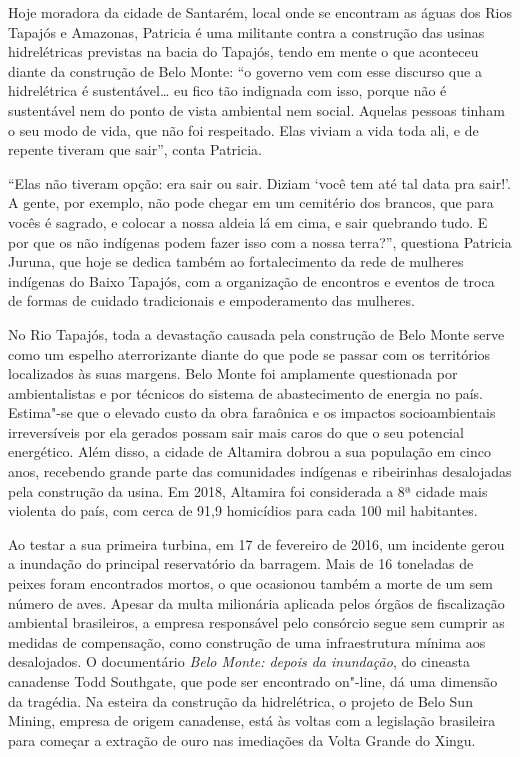 Hoje moradora da cidade de Santarém, local onde se encontram as águas
dos Rios Tapajós e Amazonas, Patricia é uma militante contra a
construção das usinas hidrelétricas previstas na bacia do Tapajós, tendo
em mente o que aconteceu diante da construção de Belo %
Monte: ``o governo vem com esse discurso que a hidrelétrica é
sustentável\ldots{} eu fico tão indignada com isso, porque não é
sustentável nem do ponto de vista ambiental nem social. Aquelas pessoas
tinham o seu modo de vida, que não foi respeitado. Elas viviam a vida
toda ali, e de repente tiveram que sair'', conta Patricia.

``Elas não tiveram opção: era sair ou sair. Diziam `você tem até tal
data pra sair!'. A gente, por exemplo, não pode chegar em um cemitério
dos brancos, que para vocês é sagrado, e colocar a nossa aldeia lá em
cima, e sair quebrando tudo. E por que os não indígenas podem fazer isso
com a nossa terra?'', questiona Patricia Juruna, que hoje se dedica também ao
fortalecimento da rede de mulheres indígenas do Baixo Tapajós, com a
organização de encontros e eventos de troca de formas de cuidado
tradicionais e empoderamento das mulheres.

No Rio Tapajós, toda a devastação causada pela construção de Belo Monte
serve como um espelho aterrorizante diante do que pode se passar com os
territórios localizados às suas margens. Belo Monte foi amplamente
questionada por ambientalistas e por técnicos do sistema de
abastecimento de energia no país. Estima"-se que o elevado custo da obra
faraônica e os impactos socioambientais irreversíveis por ela gerados
possam sair mais caros do que o seu potencial energético. Além disso, a
cidade de Altamira dobrou a sua população em cinco anos, recebendo
grande parte das comunidades indígenas e ribeirinhas desalojadas pela
construção da usina. Em 2018, Altamira foi considerada a 8ª cidade mais
violenta do país, com cerca de 91,9 homicídios para cada 100 mil
habitantes.

Ao testar a sua primeira turbina, em 17 de fevereiro de 2016, um
incidente gerou a inundação do principal reservatório da barragem. Mais
de 16 toneladas de peixes foram encontrados mortos, o que ocasionou
também a morte de um sem número de aves. Apesar da multa milionária
aplicada pelos órgãos de fiscalização ambiental brasileiros, a empresa
responsável pelo consórcio segue sem cumprir as medidas de compensação,
como construção de uma infraestrutura mínima aos desalojados. O
documentário \emph{Belo Monte: depois da inundação}, do cineasta canadense Todd
Southgate, que pode ser encontrado on"-line, dá uma dimensão da tragédia.
Na esteira da construção da hidrelétrica, o projeto de Belo Sun Mining,
empresa de origem canadense, está às voltas com a legislação brasileira
para começar a extração de ouro nas imediações da Volta Grande do Xingu.

